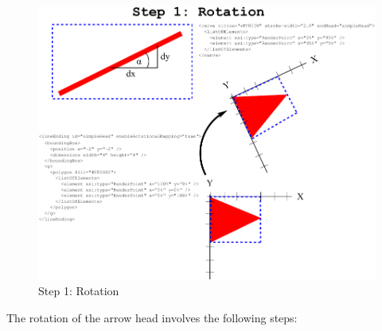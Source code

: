 \begin{figure}[!ht]
\begin{center}
\includegraphics[scale=0.25]{figures/ArrowHeadMapping6}
\end{center}
\caption{Step 1: Rotation}
\label{ArrowHeadMapping6}
\end{figure}

The rotation of the arrow head involves the following steps:

